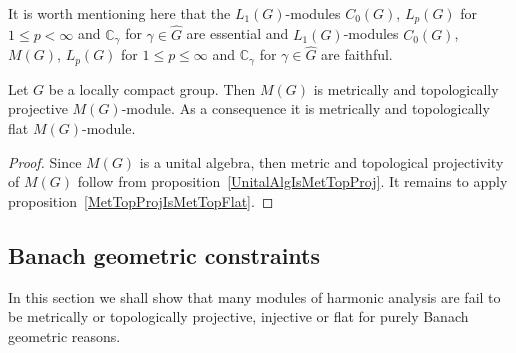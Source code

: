 It is worth mentioning here that the $L_1(G)$-modules $C_0(G)$, $L_p(G)$ for
$1\leq p<\infty$ and $\mathbb{C}_\gamma$ for $\gamma\in\widehat{G}$ are
essential and $L_1(G)$-modules $C_0(G)$, $M(G)$, $L_p(G)$ for $1\leq p\leq
\infty$ and $\mathbb{C}_\gamma$ for $\gamma\in\widehat{G}$ are faithful. 

\begin{proposition}\label{MGModMGMetTopProjFlatCharac} Let $G$ be a locally
compact group. Then $M(G)$ is metrically and topologically projective
$M(G)$-module. As a consequence it is metrically and topologically flat
$M(G)$-module.
\end{proposition} 
\begin{proof} Since $M(G)$ is a unital algebra, then metric and topological
projectivity of $M(G)$ follow from proposition~\ref{UnitalAlgIsMetTopProj}. It
remains to apply proposition~\ref{MetTopProjIsMetTopFlat}.
\end{proof}


\subsection{
    Banach geometric constraints}\label{
SubSectionBanachGeometricConstraints}

In this section we shall show that many modules of harmonic analysis are fail to
be metrically or topologically projective, injective or flat for purely Banach
geometric reasons. 

